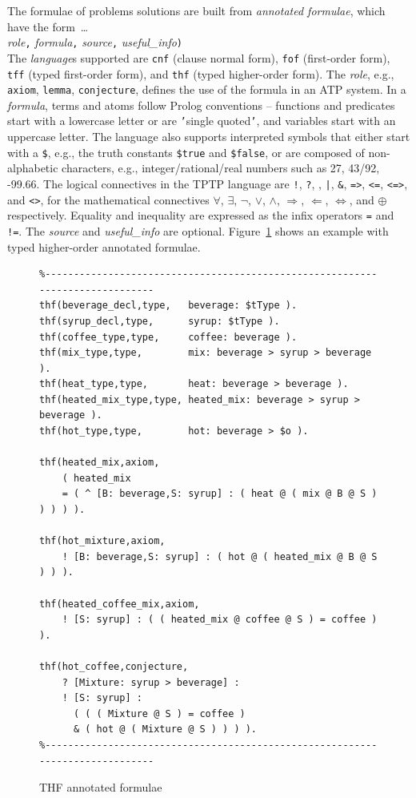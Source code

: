 \documentclass{easychair}
\newcommand{\smalltt}[1]{\small \texttt{#1}}
\begin{document}
The formulae of problems solutions are built from {\em annotated formulae}, 
which have the form~\ldots \\
{\em role}{\tt ,}
{\em formula}{\tt ,}
{\em source}{\tt ,}
{\em useful\_info}{\tt )}\\
The {\em language}s supported are {\smalltt{cnf}} (clause normal form), {\smalltt{fof}}
(first-order form), {\smalltt{tff}} (typed first-order form), and {\smalltt{thf}}
(typed higher-order form).
The {\em role}, e.g., {\smalltt{axiom}}, {\smalltt{lemma}}, {\smalltt{conjecture}}, defines the 
use of the formula in an ATP system.
In a {\em formula}, terms and atoms follow Prolog conventions -- functions and predicates start 
with a lowercase letter or are {\tt '}single quoted{\tt '}, and variables start with an uppercase 
letter.
The language also supports interpreted symbols that either start with a {\tt \$}, e.g., the 
truth constants {\smalltt{\$true}} and {\smalltt{\$false}}, or are composed of 
non-alphabetic characters, e.g., integer/rational/real numbers such as 27, 43/92, -99.66.
The logical connectives in the TPTP language are
{\tt !}, {\tt ?}, {\tt {\raisebox{0.4ex}{\texttildelow}}}, {\tt |}, {\tt \&}, {\tt =>}, {\tt <=},
{\tt <=>}, and {\tt <{\raisebox{0.4ex}{\texttildelow}}>},
for the mathematical connectives
$\forall$, $\exists$, $\neg$, $\vee$, $\wedge$, $\Rightarrow$, $\Leftarrow$, $\Leftrightarrow$, 
and $\oplus$ respectively.
Equality and inequality are expressed as the infix operators {\tt =} and {\tt !=}.
The {\em source} and {\em useful\_info} are optional.
Figure~\ref{ExampleFormulae} shows an example with typed higher-order annotated formulae.

\begin{figure}[htb]
{\footnotesize
{\setlength{\baselineskip}{3mm}
\begin{verbatim}
%------------------------------------------------------------------------------
thf(beverage_decl,type,   beverage: $tType ).
thf(syrup_decl,type,      syrup: $tType ).
thf(coffee_type,type,     coffee: beverage ).
thf(mix_type,type,        mix: beverage > syrup > beverage ).
thf(heat_type,type,       heat: beverage > beverage ).
thf(heated_mix_type,type, heated_mix: beverage > syrup > beverage ).
thf(hot_type,type,        hot: beverage > $o ).

thf(heated_mix,axiom,
    ( heated_mix
    = ( ^ [B: beverage,S: syrup] : ( heat @ ( mix @ B @ S ) ) ) ) ).

thf(hot_mixture,axiom,
    ! [B: beverage,S: syrup] : ( hot @ ( heated_mix @ B @ S ) ) ).

thf(heated_coffee_mix,axiom,
    ! [S: syrup] : ( ( heated_mix @ coffee @ S ) = coffee ) ).

thf(hot_coffee,conjecture,
    ? [Mixture: syrup > beverage] :
    ! [S: syrup] :
      ( ( ( Mixture @ S ) = coffee )
      & ( hot @ ( Mixture @ S ) ) ) ).
%------------------------------------------------------------------------------
\end{verbatim}
}}
\caption{THF annotated formulae}
\label{ExampleFormulae}
\end{figure}
\end{document}
